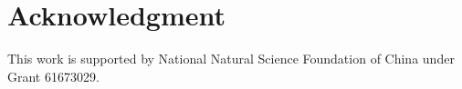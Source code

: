 \documentclass[runningheads]{llncs}
\begin{document}
\section*{Acknowledgment}
This work is supported by National Natural Science Foundation of China under Grant 61673029. 
%
 























































































































































\clearpage




\end{document}
